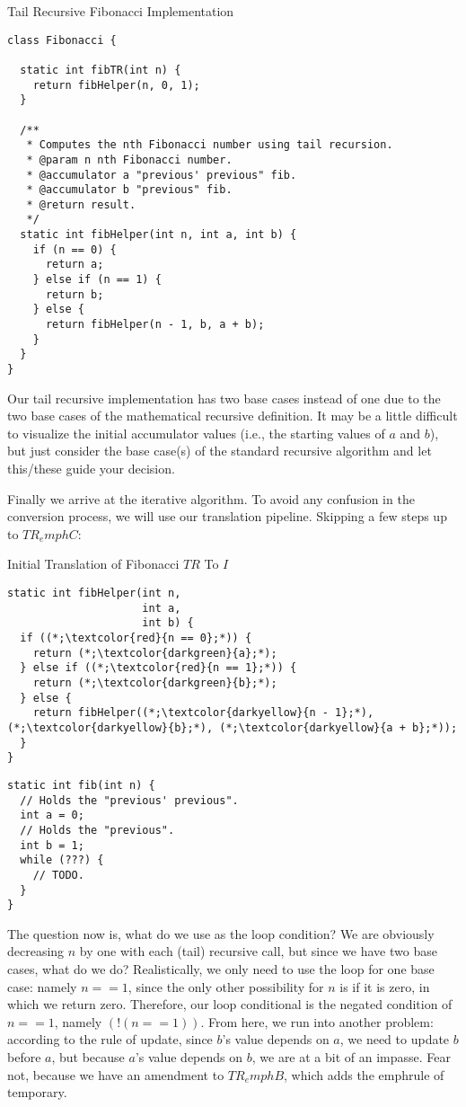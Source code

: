 \begin{cl}[]{Tail Recursive Fibonacci Implementation}
\begin{lstlisting}[language=MyJava]
class Fibonacci {

  static int fibTR(int n) {
    return fibHelper(n, 0, 1);
  }

  /**
   * Computes the nth Fibonacci number using tail recursion.
   * @param n nth Fibonacci number.
   * @accumulator a "previous' previous" fib.
   * @accumulator b "previous" fib.
   * @return result.
   */
  static int fibHelper(int n, int a, int b) {
    if (n == 0) {
      return a;
    } else if (n == 1) {
      return b;
    } else {
      return fibHelper(n - 1, b, a + b);
    }
  }
}
\end{lstlisting}
\end{cl}

Our tail recursive implementation has two base cases instead of one due to the two base cases of the mathematical recursive definition. It may be a little difficult to visualize the initial accumulator values (i.e., the starting values of $a$ and $b$), but just consider the base case(s) of the standard recursive algorithm and let this/these guide your decision.

Finally we arrive at the iterative algorithm. To avoid any confusion in the conversion process, we will use our translation pipeline. Skipping a few steps up to $TR_emph{C}$:

\begin{clrr}[]{Initial Translation of Fibonacci $TR$ To $I$}
\begin{lstlisting}[language=MyJava]
static int fibHelper(int n, 
                     int a, 
                     int b) {
  if ((*;\textcolor{red}{n == 0};*)) {
    return (*;\textcolor{darkgreen}{a};*);
  } else if ((*;\textcolor{red}{n == 1};*)) {
    return (*;\textcolor{darkgreen}{b};*);
  } else {
    return fibHelper((*;\textcolor{darkyellow}{n - 1};*), (*;\textcolor{darkyellow}{b};*), (*;\textcolor{darkyellow}{a + b};*));
  }
}
\end{lstlisting}
\tcblower
\begin{lstlisting}[language=MyJavaNLN]
static int fib(int n) {
  // Holds the "previous' previous".
  int a = 0;
  // Holds the "previous".
  int b = 1;
  while (???) {
    // TODO.
  }
}
\end{lstlisting}
\end{clrr}

The question now is, what do we use as the  loop condition? We are obviously decreasing $n$ by one with each (tail) recursive call, but since we have two base cases, what do we do? Realistically, we only need to use the loop for one base case: namely $n == 1$, since the only other possibility for $n$ is if it is zero, in which we return zero. Therefore, our loop conditional is the negated condition of $n == 1$, namely $(!(n == 1))$. From here, we run into another problem: according to the rule of update, since $b$'s value depends on $a$, we need to update $b$ before $a$, but because $a$'s value depends on $b$, we are at a bit of an impasse. Fear not, because we have an amendment to $TR_emph{B}$, which adds the emph{rule of temporary}.

